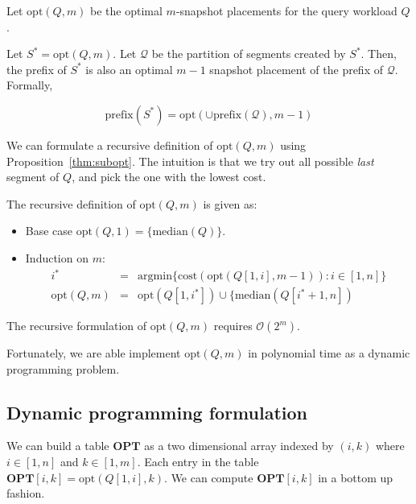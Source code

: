 Let $\mathrm{opt}(Q, m)$ be the optimal $m$-snapshot placements for the query
workload $Q$.

\begin{prop}
    \label{thm:subopt}
    Let $S^* = \mathrm{opt}(Q, m)$.  Let $\mathcal{Q}$ be the partition
    of segments created by $S^*$.  Then, the prefix of $S^*$ is also an optimal
    $m-1$ snapshot placement of the prefix of $\mathcal{Q}$.  Formally,

    $$\mathrm{prefix}(S^*) = \mathrm{opt}(\cup\mathrm{prefix}(\mathcal{Q}), m-1)$$
\end{prop}

We can formulate a recursive definition of $\mathrm{opt}(Q, m)$ using
Proposition~\ref{thm:subopt}.  The intuition is that we try out all possible
{\em last} segment of $Q$, and pick the one with the lowest cost.

The recursive definition of $\mathrm{opt}(Q, m)$ is given as:

\begin{itemize}
    \item Base case $ \mathrm{opt}(Q, 1) = \{\mathrm{median}(Q)\}$.
    \item Induction on $m$:
\begin{eqnarray*}
    i^* &=& \mathrm{argmin}\{\mathrm{cost}(\mathrm{opt}(Q[1,i], m-1)): i\in[1,
    n]\} \\
    \mathrm{opt}(Q, m) &=& \mathrm{opt}(Q[1, i^*]) \cup \{\mathrm{median}(Q[i^*+1, n])
\end{eqnarray*}
\end{itemize}

\begin{prop}
    The recursive formulation of $\mathrm{opt}(Q, m)$ requires
    $\mathcal{O}(2^{m})$.
\end{prop}

Fortunately, we are able implement $\mathrm{opt}(Q, m)$ in polynomial time as a
dynamic programming problem.

\subsection{Dynamic programming formulation}

We can build a table $\mathbf{OPT}$ as a two dimensional array
indexed by $(i, k)$ where $i\in [1, n]$ and $k\in [1, m]$.  Each entry
in the table $\mathbf{OPT}[i,k] = \mathrm{opt}(Q[1,i], k)$.
We can compute $\mathbf{OPT}[i,k]$ in a bottom up fashion.

